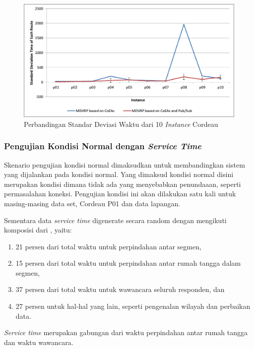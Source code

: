 \begin{figure}[H]
	\centering
	\includegraphics[width=\textwidth]{Resources/Images/test_result_10_cordeau_standard_deviation}
	\caption{Perbandingan Standar Deviasi Waktu dari 10 \textit{Instance} Cordeau}
	\label{fig:test_result_10_cordeau_standard_deviation}
\end{figure}


\subsubsection{Pengujian Kondisi Normal dengan \textit{Service Time}}
\label{ssec:test-normal-service-time}
Skenario pengujian kondisi normal dimaksudkan untuk membandingkan sistem yang dijalankan pada kondisi normal. Yang dimaksud kondisi normal disini merupakan kondisi dimana tidak ada yang menyebabkan penundaaan, seperti permasalahan koneksi. Pengujian kondisi ini akan dilakukan satu kali untuk masing-masing data set, Cordeau P01 dan data lapangan.


Sementara data \textit{service time} digenerate secara random dengan mengikuti komposisi dari \citep{sudman_time_1965}, yaitu:
\begin{enumerate}
	\item 21 persen dari total waktu untuk perpindahan antar segmen, 
	\item 15 persen dari total waktu untuk perpindahan antar rumah tangga dalam segmen, 
	\item 37 persen dari total waktu untuk wawancara seluruh responden, dan 
	\item 27 persen untuk hal-hal yang lain, seperti pengenalan wilayah dan perbaikan data.
\end{enumerate}
\textit{Service time} merupakan gabungan dari waktu perpindahan antar rumah tangga dan waktu wawancara.


